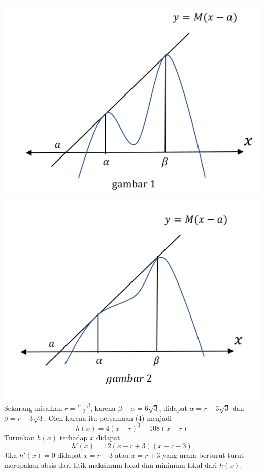 \documentclass{article}
\begin{document}
	\includegraphics[width=0.27\textheight]{17(3)}
	\includegraphics[width=0.27\textheight]{17(4)}\\
	Sekarang misalkan $r=\frac{\alpha+\beta}{2}$, karena $\beta-\alpha=6\sqrt{3}$, didapat $\alpha = r - 3\sqrt3$ dan $\beta = r +3\sqrt3$. Oleh karena itu persamaan (4) menjadi
	\begin{equation}
		h(x)=4(x-r)^3-108(x-r)
	\end{equation}
	Turunkan $h(x)$ terhadap $x$ didapat 
	\begin{equation}
		h'(x)=12(x-r+3)(x-r-3)
	\end{equation}
	Jika $h'(x)=0$ didapat $x=r-3$ atau $x=r+3$ yang mana berturut-turut merupakan absis dari titik maksimum lokal dan minimum lokal dari $h(x)$.
\end{document}
